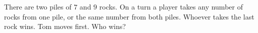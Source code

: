There are two piles of $7$ and $9$ rocks. On a turn a player takes any number of rocks from one pile, or the same number from both piles. Whoever takes the last rock wins. Tom moves first. Who wins?
